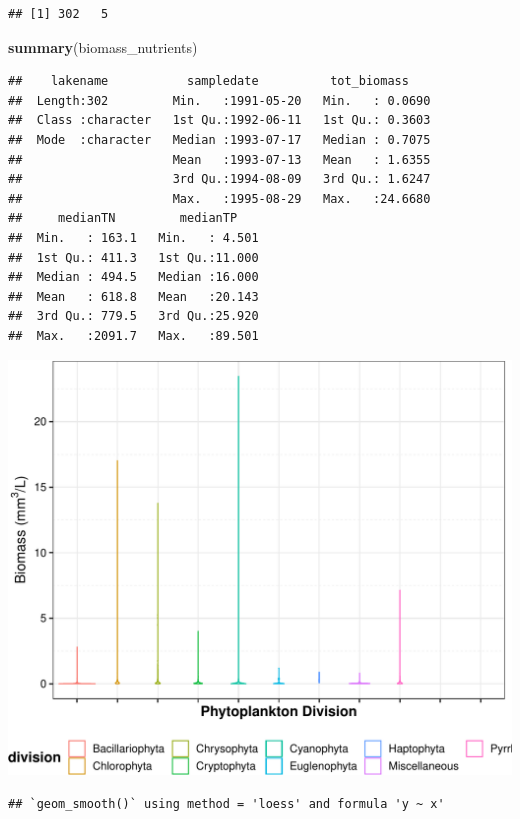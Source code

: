 \documentclass[12pt,]{article}
\newenvironment{Shaded}{\begin{snugshade}}{\end{snugshade}}
\newcommand{\KeywordTok}[1]{\textcolor[rgb]{0.13,0.29,0.53}{\textbf{#1}}}
\newcommand{\NormalTok}[1]{#1}
\begin{document}
\begin{verbatim}
## [1] 302   5
\end{verbatim}

\begin{Shaded}
\begin{Highlighting}[]
\KeywordTok{summary}\NormalTok{(biomass_nutrients)}
\end{Highlighting}
\end{Shaded}

\begin{verbatim}
##    lakename           sampledate          tot_biomass     
##  Length:302         Min.   :1991-05-20   Min.   : 0.0690  
##  Class :character   1st Qu.:1992-06-11   1st Qu.: 0.3603  
##  Mode  :character   Median :1993-07-17   Median : 0.7075  
##                     Mean   :1993-07-13   Mean   : 1.6355  
##                     3rd Qu.:1994-08-09   3rd Qu.: 1.6247  
##                     Max.   :1995-08-29   Max.   :24.6680  
##     medianTN         medianTP     
##  Min.   : 163.1   Min.   : 4.501  
##  1st Qu.: 411.3   1st Qu.:11.000  
##  Median : 494.5   Median :16.000  
##  Mean   : 618.8   Mean   :20.143  
##  3rd Qu.: 779.5   3rd Qu.:25.920  
##  Max.   :2091.7   Max.   :89.501
\end{verbatim}

\includegraphics{Chen_ENV872_Project_files/figure-latex/Figure 1-1.pdf}

\begin{verbatim}
## `geom_smooth()` using method = 'loess' and formula 'y ~ x'
\end{verbatim}
\end{document}
